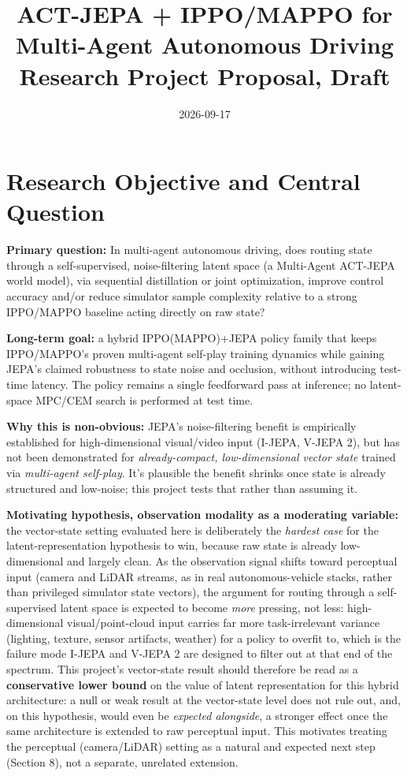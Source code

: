 \documentclass[11pt]{article}
\title{ACT-JEPA + IPPO/MAPPO for Multi-Agent Autonomous Driving\\
\large Research Project Proposal, Draft}
\author{}
\date{2026-09-17}
\begin{document}
\maketitle

\hypertarget{research-objective-and-central-question}{%
\section{Research Objective and Central Question}\label{research-objective-and-central-question}}

\textbf{Primary question:} In multi-agent autonomous driving, does routing state through a self-supervised, noise-filtering latent space (a Multi-Agent ACT-JEPA world model), via sequential distillation or joint optimization, improve control accuracy and/or reduce simulator sample complexity relative to a strong IPPO/MAPPO baseline acting directly on raw state?

\textbf{Long-term goal:} a hybrid IPPO(MAPPO)+JEPA policy family that keeps IPPO/MAPPO's proven multi-agent self-play training dynamics while gaining JEPA's claimed robustness to state noise and occlusion, without introducing test-time latency. The policy remains a single feedforward pass at inference; no latent-space MPC/CEM search is performed at test time.

\textbf{Why this is non-obvious:} JEPA's noise-filtering benefit is empirically established for high-dimensional visual/video input (I-JEPA, V-JEPA 2), but has not been demonstrated for \emph{already-compact, low-dimensional vector state} trained via \emph{multi-agent self-play}. It's plausible the benefit shrinks once state is already structured and low-noise; this project tests that rather than assuming it.

\textbf{Motivating hypothesis, observation modality as a moderating variable:} the vector-state setting evaluated here is deliberately the \emph{hardest case} for the latent-representation hypothesis to win, because raw state is already low-dimensional and largely clean. As the observation signal shifts toward perceptual input (camera and LiDAR streams, as in real autonomous-vehicle stacks, rather than privileged simulator state vectors), the argument for routing through a self-supervised latent space is expected to become \emph{more} pressing, not less: high-dimensional visual/point-cloud input carries far more task-irrelevant variance (lighting, texture, sensor artifacts, weather) for a policy to overfit to, which is the failure mode I-JEPA and V-JEPA 2 are designed to filter out at that end of the spectrum. This project's vector-state result should therefore be read as a \textbf{conservative lower bound} on the value of latent representation for this hybrid architecture: a null or weak result at the vector-state level does not rule out, and, on this hypothesis, would even be \emph{expected alongside}, a stronger effect once the same architecture is extended to raw perceptual input. This motivates treating the perceptual (camera/LiDAR) setting as a natural and expected next step (Section 8), not a separate, unrelated extension.
\end{document}
